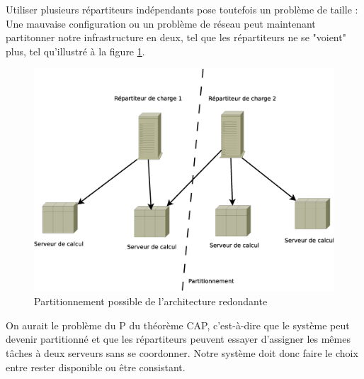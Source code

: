 


Utiliser plusieurs répartiteurs indépendants pose toutefois un problème de taille : Une mauvaise configuration ou un problème 
de réseau peut maintenant partitonner notre infrastructure en deux, tel que les répartiteurs ne se "voient" plus, tel qu'illustré à la figure \ref{fig:arch_part}.

\begin{figure}
  \includegraphics[width=\linewidth]{Arch_2_part.eps}
  \caption{Partitionnement possible de l'architecture redondante}
  \label{fig:arch_part}
\end{figure}

On aurait le problème du P du théorème CAP, c'est-à-dire que le système peut devenir partitionné et que les répartiteurs 
peuvent essayer d'assigner les mêmes tâches à deux serveurs sans se coordonner. Notre système doit donc faire le choix entre rester
disponible ou être consistant. 

